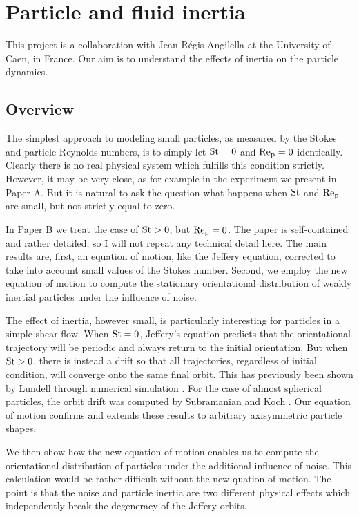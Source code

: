 \documentclass[thesis.tex]{subfiles}
\begin{document}
\chapter{Particle and fluid inertia}

This project is a collaboration with Jean-R\'egis Angilella at the University of Caen, in France. Our aim is to understand the effects of inertia on the particle dynamics.

\section{Overview}

The simplest approach to modeling small particles, as measured by the Stokes and particle Reynolds numbers, is to simply let $\mbox{St}=0$ and $\mbox{Re}_{\mathrm p}=0$ identically. Clearly there is no real physical system which fulfills this condition strictly. However, it may be very close, as for example in the experiment we present in Paper A. But it is natural to ask the question what happens when $\mbox{St}$ and $\mbox{Re}_{\mathrm p}$ are small, but not strictly equal to zero.

In Paper B we treat the case of $\mbox{St}>0$, but $\mbox{Re}_{\mathrm p}=0$. The paper is self-contained and rather detailed, so I will not repeat any technical detail here. The main results are, first, an equation of motion, like the Jeffery equation, corrected to take into account small values of the Stokes number. Second, we employ the new equation of motion to compute the stationary orientational distribution of weakly inertial particles under the influence of noise. 

The effect of inertia, however small, is particularly interesting for particles in a simple shear flow. When $\mbox{St}=0$, Jeffery's equation predicts that the orientational trajectory will be periodic and always return to the initial orientation. But when $\mbox{St}>0$, there is instead a drift so that all trajectories, regardless of initial condition, will converge onto the same final orbit. This has previously been shown by Lundell through numerical simulation \cite{lundell2010}. For the case of almost spherical particles, the orbit drift was computed by Subramanian and Koch \cite{sub06}. Our equation of motion confirms and extends these results to arbitrary axisymmetric particle shapes.

We then show how the new equation of motion enables us to compute the orientational distribution of particles under the additional influence of noise. This calculation would be rather difficult without the new quation of motion. The point is that the noise and particle inertia are two different physical effects which independently break the degeneracy of the Jeffery orbits. 
\end{document}
